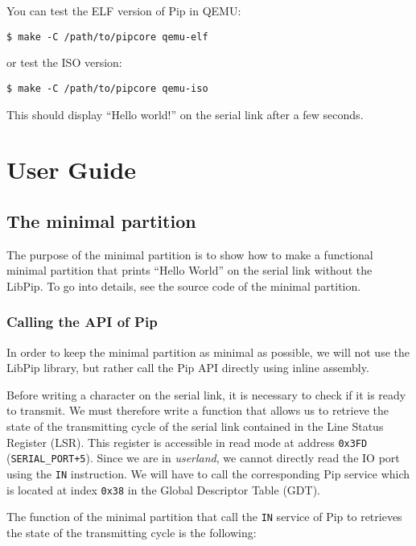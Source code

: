 \documentclass[10pt,a4paper,titlepage]{refart}
\begin{document}
You can test the ELF version of Pip in QEMU:

\begin{lstlisting}[style=BashStyle]
    $ make -C /path/to/pipcore qemu-elf
\end{lstlisting}

or test the ISO version:

\begin{lstlisting}[style=BashStyle]
    $ make -C /path/to/pipcore qemu-iso
\end{lstlisting}

This should display ``Hello world!'' on the serial link after a few seconds.

\section{User Guide}

\subsection{The minimal partition}

The purpose of the minimal partition is to show how to make a functional minimal
partition that prints ``Hello World'' on the serial link without the LibPip. To
go into details, see the source code of the minimal partition.

\subsubsection{Calling the API of Pip}

In order to keep the minimal partition as minimal as possible, we will not use
the LibPip library, but rather call the Pip API directly using inline assembly.

Before writing a character on the serial link, it is necessary to check if it is
ready to transmit. We must therefore write a function that allows us to retrieve
the state of the transmitting cycle of the serial link contained in the Line
Status Register (LSR). This register is accessible in read mode at address
\texttt{0x3FD} (\texttt{SERIAL\_PORT+5}). Since we are in \textit{userland}, we
cannot directly read the IO port using the \texttt{IN} instruction. We will have
to call the corresponding Pip service which is located at index \texttt{0x38}
in the Global Descriptor Table (GDT).

The function of the minimal partition that call the \texttt{IN} service of Pip
to retrieves the state of the transmitting cycle is the following:
\end{document}
